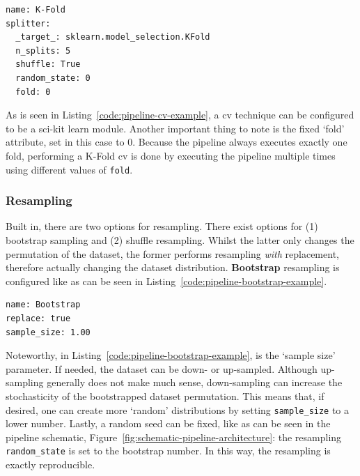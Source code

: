 \documentclass[../main.tex]{subfiles}
\begin{document}
\begin{lstlisting}[caption={A config for 5-Fold \gls{cv}, with shuffling. The split is reproducible due to the fixed random seed.}, label={code:pipeline-cv-example}]
name: K-Fold
splitter:
  _target_: sklearn.model_selection.KFold
  n_splits: 5
  shuffle: True
  random_state: 0
  fold: 0
\end{lstlisting}

As is seen in Listing~\ref{code:pipeline-cv-example}, a \gls{cv} technique can be configured to be a sci-kit learn module. Another important thing to note is the fixed `fold' attribute, set in this case to 0. Because the pipeline always executes exactly one fold, performing a K-Fold \gls{cv} is done by executing the pipeline multiple times using different values of \texttt{fold}.




\subsubsection{Resampling}
Built in, there are two options for resampling. There exist options for (1) bootstrap sampling and (2) shuffle resampling. Whilst the latter only changes the permutation of the dataset, the former performs resampling \textit{with} replacement, therefore actually changing the dataset distribution. \textbf{Bootstrap} resampling is configured like as can be seen in Listing~\ref{code:pipeline-bootstrap-example}.

\begin{lstlisting}[caption={A config for bootstrap sampling using a sample size of 1.0, i.e, using the full dataset.}, label={code:pipeline-bootstrap-example}]
name: Bootstrap
replace: true
sample_size: 1.00
\end{lstlisting}

Noteworthy, in Listing~\ref{code:pipeline-bootstrap-example}, is the `sample size' parameter. If needed, the dataset can be down- or up-sampled. Although up-sampling generally does not make much sense, down-sampling can increase the stochasticity of the bootstrapped dataset permutation. This means that, if desired, one can create more `random' distributions by setting \texttt{sample\_size} to a lower number. Lastly, a random seed can be fixed, like as can be seen in the pipeline schematic, Figure~\ref{fig:schematic-pipeline-architecture}: the resampling \texttt{random\_state} is set to the bootstrap number. In this way, the resampling is exactly reproducible.
\end{document}

